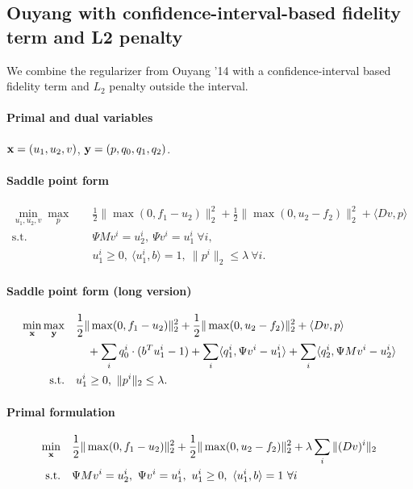 
\subsection{Ouyang with confidence-interval-based fidelity term and L2 penalty}

We combine the regularizer from Ouyang '14 with a confidence-interval based
fidelity term and $L_2$ penalty outside the interval.

\paragraph{Primal and dual variables}
$\mathbf{x} = (u_1,u_2,v)$, $\mathbf{y} = (p,q_0,q_1,q_2)$.

\paragraph{Saddle point form}
\begin{align*}
    \min_{u_1,u_2,v} \max_{p} \quad
        & \frac{1}{2} \|\max(0, f_1 - u_2)\|_2^2
          + \frac{1}{2} \|\max(0, u_2 - f_2)\|_2^2
          + \langle Dv, p \rangle \\
    \text{s.t.}\quad
        & \Psi M v^i = u_2^i, ~\Psi v^i = u_1^i ~\forall i, \\
        & u_1^i \geq 0, ~\langle u_1^i, b \rangle = 1,
          ~\|p^{i}\|_{2} \leq \lambda ~\forall i.
\end{align*}

\paragraph{Saddle point form (long version)}
\begin{align*}
    \min_{\mathbf{x}} \max_{\mathbf{y}} \quad
        & \frac{1}{2} \|\max(0, f_1 - u_2)\|_2^2
            + \frac{1}{2} \|\max(0, u_2 - f_2)\|_2^2
            + \langle Dv, p \rangle \\
        &\quad + \sum_{i} q_0^i \cdot (b^T u_1^i - 1)
            + \sum_{i} \langle q_1^i, \Psi v^i - u_1^i \rangle
            + \sum_{i} \langle q_2^i, \Psi M v^i - u_2^i \rangle \\
    \text{s.t.}\quad
        & u_1^i \geq 0, ~\|p^{i}\|_{2} \leq \lambda.
\end{align*}

\paragraph{Primal formulation}
\begin{align*}
    \min_{\mathbf{x}} \quad
        & \frac{1}{2} \|\max(0, f_1 - u_2)\|_2^2
            + \frac{1}{2} \|\max(0, u_2 - f_2)\|_2^2
            + \lambda \sum_{i} \| (D v)^{i} \|_{2} \\
    \text{s.t.}\quad
        & \Psi M v^i = u_2^i, ~\Psi v^i = u_1^i,
          ~u_1^i \geq 0, ~\langle u_1^i, b \rangle = 1 ~\forall i
\end{align*}

